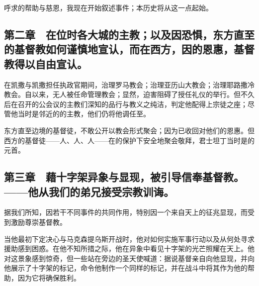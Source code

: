 呼求的帮助与慈恩，我现在开始叙述事件；本历史将从这一点起始。\par


\subsection{第二章　在位时各大城的主教；以及因恐惧，东方直至的基督教如何谨慎地宣认，而在西方，因的恩惠，基督教得以自由宣认。}

在凯撒与凯撒担任执政官期间，治理罗马教会；治理亚历山大教会；治理耶路撒冷教会。自以来，无人被任命管理教会；显然，迫害阻碍了授任礼仪的举行。但不久后在召开的公会议的主教们深知的品行与教义之纯洁，判定他配得上宗徒之座；尽管他当时是邻近的的主教，他们仍将他调任至。\par

东方直至边境的基督徒，不敢公开以教会形式聚会；因为已收回对他们的恩惠。但西方的基督徒——人、人、人——在的保护下安全地聚会敬拜，君士坦丁当时是的元首。\par


\subsection{第三章　藉十字架异象与显现，被引导信奉基督教。——他从我们的弟兄接受宗教训诲。}

据我们所知，因若干不同事件的共同作用，特别因一个来自天上的征兆显现，而受到激励尊崇基督教。\par

当他最初下定决心与马克森提乌斯开战时，他对如何实施军事行动以及从何处寻求援助感到困惑。在他不知所措之际，他在异象中看见十字架的光芒照耀在天上。他对这景象感到惊奇，但一些站在旁边的圣天使喊道：据说基督亲自向他显现，并向他展示了十字架的标记，命令他制作一个同样的标记，并在战斗中将其作为他的帮助，因为它将确保胜利。\par

